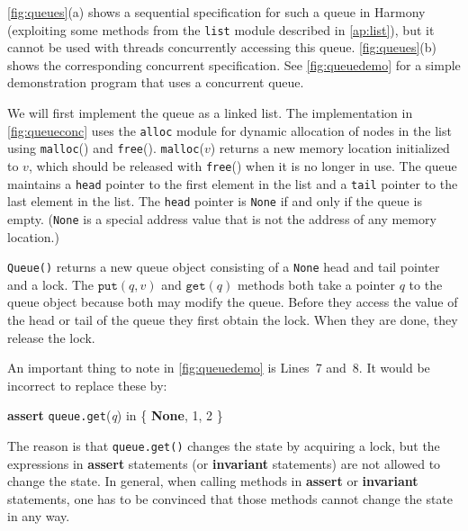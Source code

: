 \documentclass{report}
\newenvironment{code}{
\tcolorbox
}{
\endtcolorbox
}
\begin{document}
\noindent
\autoref{fig:queues}(a) shows a sequential specification for such a
queue in Harmony (exploiting some methods from the \texttt{list}
module described in \autoref{ap:list}),
but it cannot be used with threads concurrently accessing this queue.
\autoref{fig:queues}(b) shows the corresponding concurrent specification.
See \autoref{fig:queuedemo} for a simple demonstration program that uses
a concurrent queue.

We will first implement the queue as a linked list.
The implementation in \autoref{fig:queueconc}
uses the \texttt{alloc} module for dynamic allocation
%
of nodes in the list using \texttt{malloc}() and \texttt{free}().
\texttt{malloc}($v$) returns a new memory location initialized to $v$,
which should be released with \texttt{free}() when it is no longer in use.
The queue maintains a \texttt{head} pointer to the first element in the list
and a \texttt{tail} pointer to the last element in the list.
The \texttt{head} pointer is \texttt{None} if and only if the queue is empty.
(\texttt{None} is a special address value that is not the address of any
memory location.)

\texttt{Queue()} returns a new queue object consisting of a \texttt{None} head
and tail pointer and a lock.
The $\mathtt{put}(q, v)$ and $\mathtt{get}(q)$ methods both take a pointer $q$ to the
queue object because both may modify the queue.
Before they access the value of the head or tail of the queue they first obtain
the lock.
When they are done, they release the lock.

An important thing to note in \autoref{fig:queuedemo}
is Lines~7 and~8.
It would be incorrect to replace these by:

\begin{code}
\textbf{assert} \texttt{queue.get}(\textit{q}) in \{ \textbf{None}, 1, 2 \}
\end{code}

The reason is that \texttt{queue.get()} changes the state by
acquiring a lock, but the expressions in \textbf{assert}
statements (or \textbf{invariant} statements)
are not allowed to change the state.
In general, when calling methods in \textbf{assert} or
\textbf{invariant} statements, one has to be convinced that
those methods cannot change the state in any way.
\end{document}
